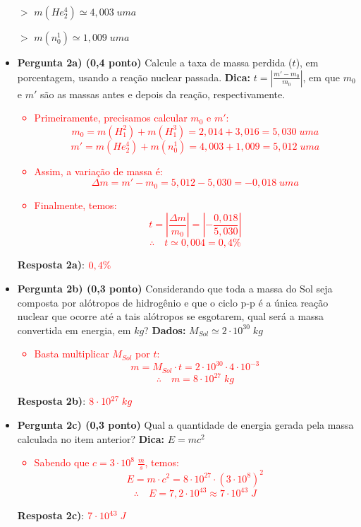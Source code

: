 \documentclass[a4paper, 12pt]{article}
\newcommand{\red}[1]{\textcolor{red}{#1}}
\begin{document}
\begin{flushleft}
\begin{itemize}
\begin{multicols}{2}
\begin{itemize}
					\item[$>$] $m(He_2^4) \simeq 4,003 \; uma$
					\item[$>$] $m(n_0^1) \simeq 1,009 \; uma$
				\end{itemize} \end{multicols}
				\begin{itemize}
					\item \textbf{Pergunta 2a) (0,4 ponto)} Calcule a taxa de massa perdida ($t$), em porcentagem, usando a reação nuclear passada. \linebreak
						\textbf{Dica:} $t= \left| \frac{m'-m_0}{m_0} \right|$, em que $m_0$ e $m'$ são as massas antes e depois da reação, respectivamente.
						\red{\begin{itemize}
							\item Primeiramente, precisamos calcular $m_0$ e $m'$:
								$$m_0 = m(H_1^2) + m(H_1^3) = 2,014 + 3,016 = 5,030 \; uma$$
								$$m' = m(He_2^4) + m(n_0^1) = 4,003 + 1,009 = 5,012 \; uma$$
							\item Assim, a variação de massa é:
								$$\Delta m = m' - m_0 = 5,012 - 5,030 = - 0,018 \; uma$$
							\item Finalmente, temos:
								$$t = \left| \frac{\Delta m}{m_0} \right| = \left| - \frac{0,018}{5,030} \right|$$
								$$\therefore \quad t \simeq 0,004 = 0,4\%$$
						\end{itemize}}
						\textbf{Resposta 2a)}: $\red{0,4\%}$
					\item \textbf{Pergunta 2b) (0,3 ponto)} Considerando que toda a massa do Sol seja composta por alótropos de hidrogênio e que o ciclo p-p é a única reação nuclear que ocorre até a tais alótropos se esgotarem, qual será a massa convertida em energia, em $kg$? \linebreak
						\textbf{Dados:} $M_{Sol} \simeq 2 \cdot 10^{30} \; kg$
						\red{\begin{itemize}
							\item Basta multiplicar $M_{Sol}$ por $t$:
								$$m = M_{Sol} \cdot t = 2 \cdot 10^{30} \cdot 4 \cdot 10^{-3}$$
								$$\therefore \quad m = 8 \cdot 10^{27} \; kg$$
						\end{itemize}}
						\textbf{Resposta 2b)}: $\red{8 \cdot 10^{27} \; kg}$
					\item \textbf{Pergunta 2c) (0,3 ponto)} Qual a quantidade de energia gerada pela massa calculada no item anterior? \linebreak
						\textbf{Dica:} $E = m c^2$
						\red{\begin{itemize}
							\item Sabendo que $c=3 \cdot 10^8 \; \frac{m}{s}$, temos:
								$$E = m \cdot c^2 = 8 \cdot 10^{27} \cdot (3 \cdot 10^8)^2$$
								$$\therefore \quad E = 7,2 \cdot 10^{43} \approx 7 \cdot 10^{43} \; J$$
						\end{itemize}}
						\textbf{Resposta 2c)}: $\red{7 \cdot 10^{43} \; J}$
				\end{itemize}
				

\end{itemize}
\end{flushleft}
\end{document}
